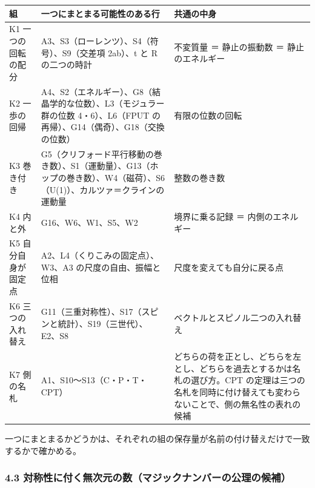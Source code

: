 \documentclass[
  a4paper,
]{ltjsarticle}
\newcounter{none} %
\begin{document}
{\def\LTcaptype{none} %
\begin{longtable}[]{@{}
  >{\raggedright\arraybackslash}p{}
  >{\raggedright\arraybackslash}p{}
  >{\raggedright\arraybackslash}p{}@{}}
\toprule\noalign{}
\begin{minipage}[b]{\linewidth}\raggedright
組
\end{minipage} & \begin{minipage}[b]{\linewidth}\raggedright
一つにまとまる可能性のある行
\end{minipage} & \begin{minipage}[b]{\linewidth}\raggedright
共通の中身
\end{minipage} \\
\midrule\noalign{}
\endhead
\bottomrule\noalign{}
\endlastfoot
K1 一つの回転の配分 & A3、S3（ローレンツ）、S4（符号）、S9（交差項
2ab）、t と R の二つの時計 & 不変質量 ＝ 静止の振動数 ＝
静止のエネルギー \\
K2 一歩の回帰 &
A4、S2（エネルギー）、G8（結晶学的な位数）、L3（モジュラー群の位数
4・6）、L6（FPUT の再帰）、G14（偶奇）、G18（交換の位数） &
有限の位数の回転 \\
K3 巻き付き &
G5（クリフォード平行移動の巻き数）、S1（運動量）、G13（ホップの巻き数）、W4（磁荷）、S6（U(1)）、カルツァ＝クラインの運動量
& 整数の巻き数 \\
K4 内と外 & G16、W6、W1、S5、W2 & 境界に乗る記録 ＝ 内側のエネルギー \\
K5 自分自身が固定点 & A2、L4（くりこみの固定点）、W3、A3
の尺度の自由、振幅と位相 & 尺度を変えても自分に戻る点 \\
K6 三つの入れ替え &
G11（三重対称性）、S17（スピンと統計）、S19（三世代）、E2、S8 &
ベクトルとスピノル二つの入れ替え \\
K7 側の名札 & A1、S10〜S13（C・P・T・CPT） &
どちらの荷を正とし、どちらを左とし、どちらを過去とするかは名札の選び方。CPT
の定理は三つの名札を同時に付け替えても変わらないことで、側の無名性の表れの候補 \\
\end{longtable}
}

一つにまとまるかどうかは、それぞれの組の保存量が名前の付け替えだけで一致するかで確かめる。

\subsubsection{4.3
対称性に付く無次元の数（マジックナンバーの公理の候補）}\label{ux5bfeux79f0ux6027ux306bux4ed8ux304fux7121ux6b21ux5143ux306eux6570ux30deux30b8ux30c3ux30afux30caux30f3ux30d0ux30fcux306eux516cux7406ux306eux5019ux88dc}
\end{document}
